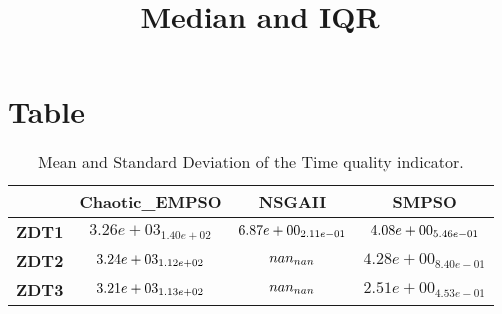 \documentclass{article}
\title{Median and IQR}
\author{}
\begin{document}
\maketitle
\section{Table}
\begin{table}[!htp]
  \caption{Mean and Standard Deviation of the Time quality indicator.}
  \label{table:Time}
  \centering
  \begin{scriptsize}
  \begin{tabular}{c|ccc}
      & \textbf{Chaotic\_EMPSO} & \textbf{NSGAII} & \textbf{SMPSO} \\\hline
      \textbf{ZDT1} & $3.26e+03_{1.40e+02} $ & $ \cellcolor{gray25} 6.87e+00_{2.11e-01} $ & $ \cellcolor{gray95} 4.08e+00_{5.46e-01}$ \\
      \textbf{ZDT2} & $\cellcolor{gray95} 3.24e+03_{1.12e+02} $ & $ \cellcolor{gray25} nan_{nan} $ & $ 4.28e+00_{8.40e-01}$ \\
      \textbf{ZDT3} & $\cellcolor{gray95} 3.21e+03_{1.13e+02} $ & $ \cellcolor{gray25} nan_{nan} $ & $ 2.51e+00_{4.53e-01}$ \\
  \end{tabular}
  \end{scriptsize}
\end{table}
\end{document}
